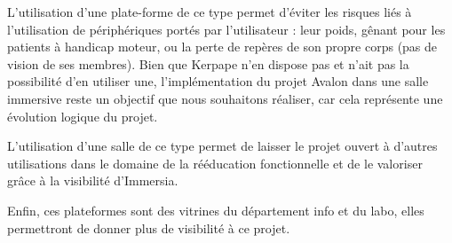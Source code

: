 L'utilisation d'une plate-forme de ce type permet d'éviter les risques liés à l'utilisation de périphériques portés par l'utilisateur : leur poids, gênant pour les patients à handicap moteur, ou la perte de repères de son propre corps (pas de vision de ses membres).
Bien que Kerpape n'en dispose pas et n'ait pas la possibilité d'en utiliser une, l'implémentation du projet Avalon dans une salle immersive reste un objectif que nous souhaitons réaliser, car cela représente une évolution logique du projet.

L'utilisation d'une salle de ce type permet de laisser le projet ouvert à d'autres utilisations dans le domaine de la rééducation fonctionnelle et de le valoriser grâce à la visibilité d'Immersia.

Enfin, ces plateformes sont des vitrines du département info et du labo, elles permettront de donner plus de visibilité à ce projet.
